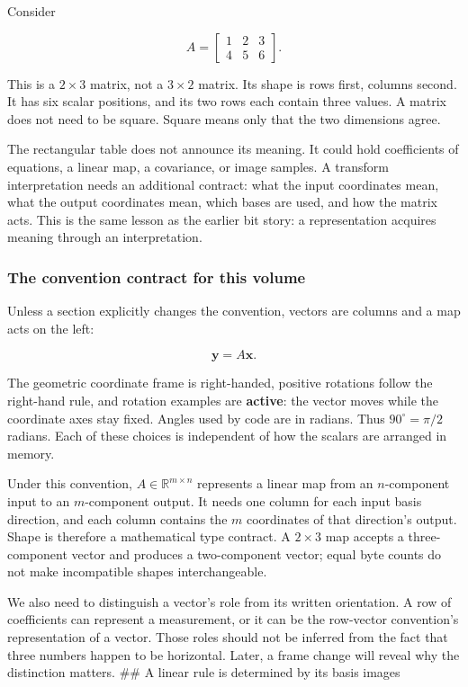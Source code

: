 Consider

\[
A=\begin{bmatrix}1&2&3\\4&5&6\end{bmatrix}.
\]

This is a \(2\times3\) matrix, not a \(3\times2\) matrix. Its shape is rows first, columns second. It has six scalar positions, and its two rows each contain three values. A matrix does not need to be square. Square means only that the two dimensions agree.

The rectangular table does not announce its meaning. It could hold coefficients of equations, a linear map, a covariance, or image samples. A transform interpretation needs an additional contract: what the input coordinates mean, what the output coordinates mean, which bases are used, and how the matrix acts. This is the same lesson as the earlier bit story: a representation acquires meaning through an interpretation.

\subsubsection{The convention contract for this volume}\label{01-foundations-i-ch018-the-convention-contract-for-this-volume}

Unless a section explicitly changes the convention, vectors are columns and a map acts on the left:

\[
\mathbf y=A\mathbf x.
\]

The geometric coordinate frame is right-handed, positive rotations follow the right-hand rule, and rotation examples are \textbf{active}: the vector moves while the coordinate axes stay fixed. Angles used by code are in radians. Thus \(90^\circ=\pi/2\) radians. Each of these choices is independent of how the scalars are arranged in memory.

Under this convention, \(A\in\mathbb R^{m\times n}\) represents a linear map from an \(n\)-component input to an \(m\)-component output. It needs one column for each input basis direction, and each column contains the \(m\) coordinates of that direction's output. Shape is therefore a mathematical type contract. A \(2\times3\) map accepts a three-component vector and produces a two-component vector; equal byte counts do not make incompatible shapes interchangeable.

We also need to distinguish a vector's role from its written orientation. A row of coefficients can represent a measurement, or it can be the row-vector convention's representation of a vector. Those roles should not be inferred from the fact that three numbers happen to be horizontal. Later, a frame change will reveal why the distinction matters. \#\# A linear rule is determined by its basis images

